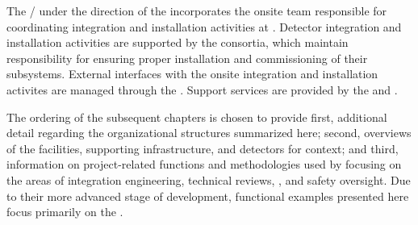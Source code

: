 The /  under the 
direction of the  incorporates the onsite team responsible 
for coordinating integration and installation activities at .
Detector integration and installation activities are supported by the
 consortia, which maintain responsibility for ensuring
proper installation and commissioning of their subsystems.  External
 interfaces with the onsite integration and installation
activites are managed through the . Support services are
provided by the  and .

The ordering of the subsequent chapters is chosen to provide first,  
additional detail regarding the organizational structures summarized 
here; second, overviews of the facilities, supporting infrastructure, 
and detectors for context; and third, information on project-related 
functions and methodologies used by   
focusing on the areas of integration engineering, technical reviews, 
, and safety oversight.  Due to their more advanced stage 
of development, functional examples presented here focus primarily on 
the  .
